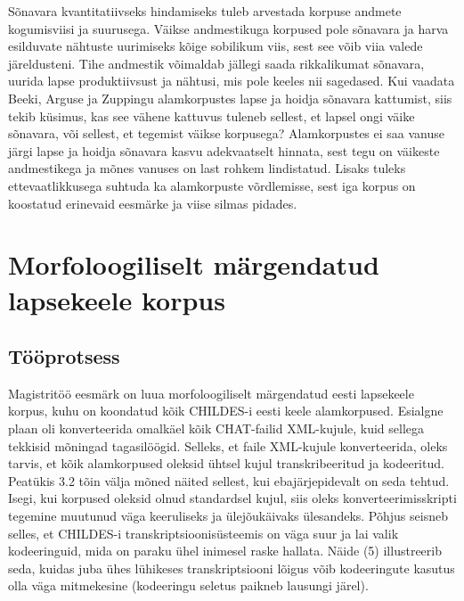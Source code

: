 \documentclass[12pt]{article}
\begin{document}
Sõnavara kvantitatiivseks hindamiseks tuleb arvestada korpuse andmete kogumisviisi ja suurusega. Väikse andmestikuga korpused pole sõnavara ja harva esilduvate nähtuste uurimiseks kõige sobilikum viis, sest see võib viia valede järeldusteni. Tihe andmestik võimaldab jällegi saada rikkalikumat sõnavara, uurida lapse produktiivsust ja nähtusi, mis pole keeles nii sagedased. \citep{Tomasello} Kui vaadata Beeki, Arguse ja Zuppingu alamkorpustes lapse ja hoidja sõnavara kattumist, siis tekib küsimus, kas see vähene kattuvus tuleneb sellest, et lapsel ongi väike sõnavara, või sellest, et tegemist väikse korpusega? Alamkorpustes ei saa vanuse järgi lapse ja hoidja sõnavara kasvu adekvaatselt hinnata, sest tegu on väikeste andmestikega ja mõnes vanuses on last rohkem lindistatud. Lisaks tuleks ettevaatlikkusega suhtuda ka alamkorpuste võrdlemisse, sest iga korpus on koostatud erinevaid eesmärke ja viise silmas pidades.


\newpage

\section{Morfoloogiliselt märgendatud lapsekeele korpus}

\subsection{Tööprotsess}

Magistritöö eesmärk on luua morfoloogiliselt märgendatud eesti lapsekeele korpus, kuhu on koondatud kõik CHILDES-i eesti keele alamkorpused. Esialgne plaan oli konverteerida omalkäel kõik CHAT-failid XML-kujule, kuid sellega tekkisid mõningad tagasilöögid. Selleks, et faile XML-kujule konverteerida, oleks tarvis, et kõik alamkorpused oleksid ühtsel kujul transkribeeritud ja kodeeritud. Peatükis 3.2 tõin välja mõned näited sellest, kui ebajärjepidevalt on seda tehtud. Isegi, kui korpused oleksid olnud standardsel kujul, siis oleks konverteerimisskripti tegemine muutunud väga keeruliseks ja ülejõukäivaks ülesandeks. Põhjus seisneb selles, et CHILDES-i transkriptsioonisüsteemis on väga suur ja lai valik kodeeringuid, mida on paraku ühel inimesel raske hallata. Näide (5) illustreerib seda, kuidas juba ühes lühikeses transkriptsiooni lõigus võib kodeeringute kasutus olla väga mitmekesine (kodeeringu seletus paikneb lausungi järel).
\end{document}
